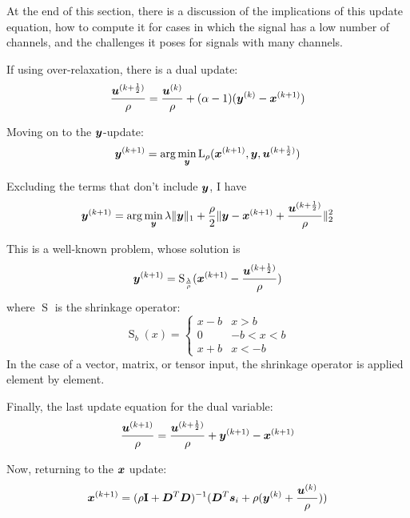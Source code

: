 At the end of this section, there is a discussion of the implications of this update equation, how to compute it for cases in which the signal has a low number of channels, and the challenges it poses for signals with many channels.

If using over-relaxation, there is a dual update:
\begin{equation}
\frac{\bm{u}^{(k + \frac{1}{2})}}{\rho} = \frac{\bm{u}^{(k)}}{\rho} + (\alpha - 1)(\bm{y}^{(k)} - \bm{x}^{(k + 1)})
\end{equation}

Moving on to the $\bm{y}$-update:
\begin{equation}
\bm{y}^{(k + 1)} = \arg\min_{\bm{y}} \operatorname{L}_{\rho}(\bm{x}^{(k + 1)},\bm{y},\bm{u}^{(k + \frac{1}{2})})
\end{equation}

Excluding the terms that don't include $\bm{y}$, I have
\begin{equation}
\bm{y}^{(k + 1)} = \arg\min_{\bm{y}} \lambda\|\bm{y}\|_1 + \frac{\rho}{2}\|\bm{y} - \bm{x}^{(k + 1)} + \frac{\bm{u}^{(k + \frac{1}{2})}}{\rho}\|_2^2
\end{equation}

This is a well-known problem, whose solution is
\begin{equation}
\bm{y}^{(k + 1)} = \operatorname{S}_{\frac{\lambda}{\rho}}(\bm{x}^{(k + 1)} - \frac{\bm{u}^{(k + \frac{1}{2})}}{\rho})
\end{equation}
where $\operatorname{S}$ is the shrinkage operator:
\begin{equation}
\operatorname{S}_{b}(x) = \begin{cases} x - b & x > b \\ 0 & -b < x < b \\ x + b & x < - b \end{cases}
\end{equation}
In the case of a vector, matrix, or tensor input, the shrinkage operator is applied element by element.

Finally, the last update equation for the dual variable:
\begin{equation}
\frac{\bm{u}^{(k + 1)}}{\rho} = \frac{\bm{u}^{(k + \frac{1}{2})}}{\rho} + \bm{y}^{(k + 1)} - \bm{x}^{(k + 1)}
\end{equation}

Now, returning to the $\bm{x}$ update:
\begin{equation}
\bm{x}^{(k + 1)} = (\rho{\bf I} + \bm{D}^T\bm{D})^{-1}(\bm{D}^T\bm{s}_i + \rho(\bm{y}^{(k)} + \frac{\bm{u}^{(k)}}{\rho}))
\end{equation}

